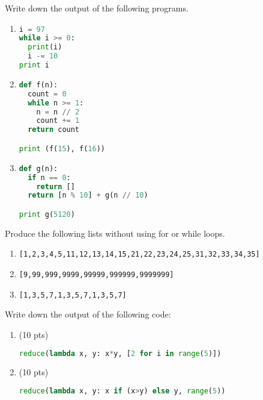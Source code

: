 \documentclass[addpoints,12pt]{exam}
\newcommand{\code}[1]{{\texttt{#1}}}
\begin{document}
\begin{questions}

\question[20]
Write down the output of the following programs.

\begin{enumerate}
  \item 
\begin{lstlisting}[language=python]
i = 97 
while i >= 0:
  print(i)
  i -= 10
print i
\end{lstlisting}
    \vfill

\item 
\begin{lstlisting}[language=python]
def f(n):
  count = 0
  while n >= 1:
    n = n // 2
    count += 1
  return count

print (f(15), f(16))
\end{lstlisting}

    \vfill

  \item 
\begin{lstlisting}[language=python]
def g(n):
  if n == 0:
    return [] 
  return [n % 10] + g(n // 10) 

print g(5120)
\end{lstlisting}

    \vfill
\end{enumerate}

\newpage
\question[20] Produce the following lists without using for or while loops. 
\begin{enumerate}
  \item \code{[1,2,3,4,5,11,12,13,14,15,21,22,23,24,25,31,32,33,34,35]}
    \vfill
  \item \code{[9,99,999,9999,99999,999999,9999999]}
    \vfill
  \item \code{[1,3,5,7,1,3,5,7,1,3,5,7]}
    \vfill
\end{enumerate}

\newpage
\question[20] Write down the output of the following code:

\begin{enumerate}
  \item (10 pts) 
\begin{lstlisting}[language=python]
reduce(lambda x, y: x*y, [2 for i in range(5)])
\end{lstlisting}
\vfill

  \item (10 pts) 
\begin{lstlisting}[language=python]
reduce(lambda x, y: x if (x>y) else y, range(5))
\end{lstlisting}
\vfill


\end{enumerate}
\end{questions}
\end{document}
